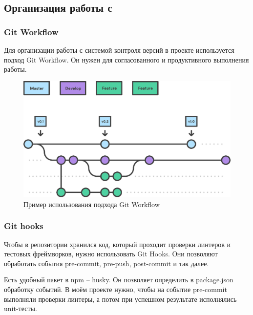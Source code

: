 \subsection{Организация работы с \textcite{git}}
\subsubsection{Git Workflow}
Для организации работы с системой контроля версий в проекте используется подход Git Workflow. Он нужен для согласованного и продуктивного выполнения работы.

\begin{figure}[h!]
    \begin{center}
        \includegraphics[scale=0.6]{images/git-workflow.eps}
    \end{center}
    \caption{Пример использования подхода Git Workflow}
\end{figure}

\subsubsection{Git hooks}
Чтобы в репозитории хранился код, который проходит проверки линтеров и тестовых фреймворков, нужно использовать Git Hooks. Они позволяют обработать события pre-commit, pre-push, post-commit и так далее.

Есть удобный пакет в npm -- husky. Он позволяет определить в package.json обработку событий. В моём проекте нужно, чтобы на событие pre-commit выполняли проверки линтеры, а потом при успешном результате исполнялись unit-тесты.


\clearpage